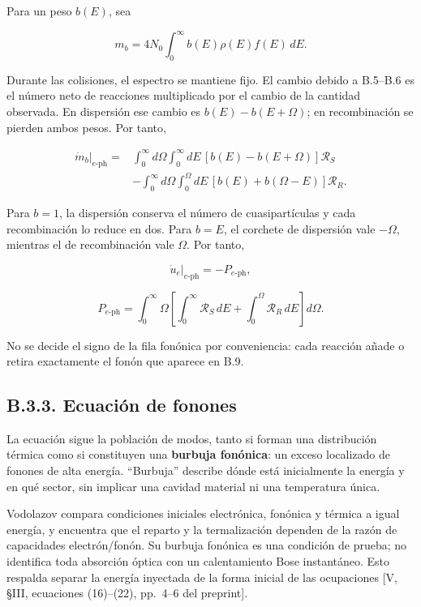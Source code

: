 \documentclass[
  spanish,
  10pt,
  a4paper,
]{article}
\newcounter{none} %
\begin{document}
Para un peso \(b(E)\), sea

\[
m_b=4N_0\int_0^\infty b(E)\rho(E)f(E)\,dE.
\]

Durante las colisiones, el espectro se mantiene fijo. El cambio debido a
B.5--B.6 es el número neto de reacciones multiplicado por el cambio de
la cantidad observada. En dispersión ese cambio es \(b(E)-b(E+\Omega)\);
en recombinación se pierden ambos pesos. Por tanto,

\[
\begin{aligned}
\left.\dot m_b\right|_{e\text{-ph}}={}&
\int_0^\infty d\Omega\int_0^\infty dE\,
[b(E)-b(E+\Omega)]\mathcal R_S\\
&-\int_0^\infty d\Omega\int_0^\Omega dE\,
[b(E)+b(\Omega-E)]\mathcal R_R.
\end{aligned} \tag{B.7}
\]

Para \(b=1\), la dispersión conserva el número de cuasipartículas y cada
recombinación lo reduce en dos. Para \(b=E\), el corchete de dispersión
vale \(-\Omega\), mientras el de recombinación vale \(\Omega\). Por
tanto,

\[
\left.\dot u_e\right|_{e\text{-ph}}=-P_{e\text{-ph}}, \tag{B.8}
\]

\[
P_{e\text{-ph}}=\int_0^\infty\Omega\left[
\int_0^\infty\mathcal R_S\,dE+
\int_0^\Omega\mathcal R_R\,dE\right]d\Omega. \tag{B.9}
\]

No se decide el signo de la fila fonónica por conveniencia: cada
reacción añade o retira exactamente el fonón que aparece en B.9.

\subsection{B.3.3. Ecuación de
fonones}\label{b.3.3.-ecuaciuxf3n-de-fonones}

La ecuación sigue la población de modos, tanto si forman una
distribución térmica como si constituyen una \textbf{burbuja fonónica}:
un exceso localizado de fonones de alta energía. ``Burbuja'' describe
dónde está inicialmente la energía y en qué sector, sin implicar una
cavidad material ni una temperatura única.

Vodolazov compara condiciones iniciales electrónica, fonónica y térmica
a igual energía, y encuentra que el reparto y la termalización dependen
de la razón de capacidades electrón/fonón. Su burbuja fonónica es una
condición de prueba; no identifica toda absorción óptica con un
calentamiento Bose instantáneo. Esto respalda separar la energía
inyectada de la forma inicial de las ocupaciones {[}V, §III, ecuaciones
(16)--(22), pp.~4--6 del preprint{]}.
\end{document}
